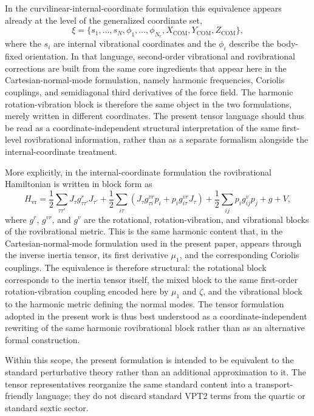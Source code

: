 In the curvilinear-internal-coordinate formulation this equivalence
appears already at the level of the generalized coordinate set,
\begin{equation}
\xi = \{s_1,\ldots,s_N,\phi_1,\ldots,\phi_{N_r},
X_{\mathrm{COM}},Y_{\mathrm{COM}},Z_{\mathrm{COM}}\},
\end{equation}
where the $s_i$ are internal vibrational coordinates and the $\phi_i$
describe the body-fixed orientation.\cite{cubic-internal_2024} In
that language, second-order vibrational and rovibrational corrections
are built from the same core ingredients that appear here in the
Cartesian-normal-mode formulation, namely harmonic frequencies,
Coriolis couplings, and semidiagonal third derivatives of the force
field. The harmonic rotation-vibration block is therefore the same
object in the two formulations, merely written in different
coordinates. The present tensor language should thus be read as a
coordinate-independent structural interpretation of the same
first-level rovibrational information, rather than as a separate
formalism alongside the internal-coordinate treatment.

More explicitly, in the internal-coordinate formulation the
rovibrational Hamiltonian is written in block form as
\begin{equation}
H_{\mathrm{vr}}
=
\frac12 \sum_{\tau\tau'} J_\tau g^{r}_{\tau\tau'} J_{\tau'}
+ \frac12 \sum_{i\tau}\left(J_\tau g^{vr}_{\tau i} p_i + p_i g^{vr}_{i\tau} J_\tau\right)
+ \frac12 \sum_{ij} p_i g^{v}_{ij} p_j
+ g + V,
\end{equation}
where $g^r$, $g^{vr}$, and $g^v$ are the rotational,
rotation-vibration, and vibrational blocks of the rovibrational
metric.\cite{cubic-internal_2024} This is the same harmonic
content that, in the Cartesian-normal-mode formulation used in the
present paper, appears through the inverse inertia tensor, its first
derivative $\mu_1$, and the corresponding Coriolis couplings.
The equivalence is therefore structural: the rotational block
corresponds to the inertia tensor itself, the mixed block to the same
first-order rotation-vibration coupling encoded here by $\mu_1$ and
$\zeta$, and the vibrational block to the harmonic metric defining the
normal modes. The tensor formulation adopted in the present work is
thus best understood as a coordinate-independent rewriting of the same
harmonic rovibrational block rather than as an alternative formal
construction.

Within this scope, the present formulation is intended to be
equivalent to the standard perturbative theory rather than an
additional approximation to it. The tensor representatives reorganize
the same standard content into a transport-friendly language; they do
not discard standard VPT2 terms from the quartic or standard sextic
sector.

